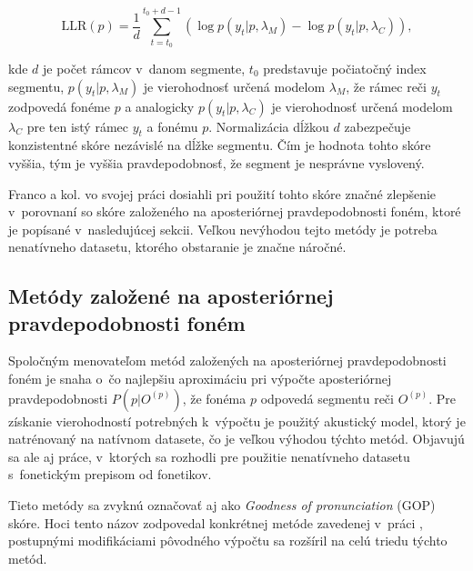 \begin{equation} \label{eq:llr-score}
    \text{LLR}(p) = \frac{1}{d} \sum_{t = t_0}^{t_0 + d - 1} \left(\log p(y_t|p, \lambda_M) - \log p(y_t|p, \lambda_C) \right),
\end{equation}

\noindent kde $d$ je počet rámcov v~danom segmente, $t_0$ predstavuje počiatočný index segmentu, $p(y_t|p, \lambda_M)$ je vierohodnosť určená modelom $\lambda_M$, že rámec reči $y_t$ zodpovedá fonéme $p$ a analogicky $p(y_t|p, \lambda_C)$ je vierohodnosť určená modelom $\lambda_C$ pre ten istý rámec $y_t$ a fonému $p$. Normalizácia dĺžkou $d$ zabezpečuje konzistentné skóre nezávislé na dĺžke segmentu. Čím je hodnota tohto skóre vyššia, tým je vyššia pravdepodobnosť, že segment je nesprávne vyslovený. %

Franco a kol. vo svojej práci \cite{Franco1999} dosiahli pri použití tohto skóre značné zlepšenie v~porovnaní so skóre založeného na aposteriórnej pravdepodobnosti foném, ktoré je popísané v~nasledujúcej sekcii. Veľkou nevýhodou tejto metódy je potreba nenatívneho datasetu, ktorého obstaranie je značne náročné. 


\subsection{Metódy založené na aposteriórnej pravdepodobnosti foném} \label{sec:posterior-prob-score}

Spoločným menovateľom metód založených na aposteriórnej pravdepodobnosti foném je snaha o~čo najlepšiu aproximáciu pri výpočte aposteriórnej pravdepodobnosti $P(p|O^{(p)})$, že fonéma $p$ odpovedá segmentu reči $O^{(p)}$. Pre získanie vierohodností potrebných k~výpočtu je použitý akustický model, ktorý
je natrénovaný na natívnom datasete, čo je veľkou výhodou týchto metód. Objavujú sa ale aj práce, v~ktorých sa rozhodli pre použitie nenatívneho datasetu \cite{Arora2017} s~fonetickým prepisom od fonetikov.

Tieto metódy sa zvyknú označovať aj ako \textit{Goodness of pronunciation} (GOP) skóre. Hoci tento názov zodpovedal konkrétnej metóde zavedenej v~práci \cite{Witt2000}, postupnými modifikáciami pôvodného výpočtu sa rozšíril na celú triedu týchto metód.

